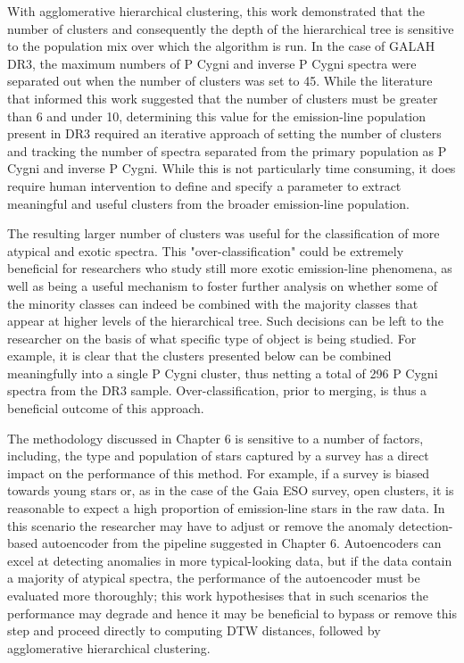 With agglomerative hierarchical clustering, this work demonstrated that the number of clusters and consequently the depth of the hierarchical tree is sensitive to the population mix over which the algorithm is run. In the case of GALAH DR3, the maximum numbers of P Cygni and inverse P Cygni spectra were separated out when the number of clusters was set to 45. While the literature that informed this work suggested that the number of clusters must be greater than 6 and under 10, determining this value for the emission-line population present in DR3 required an iterative approach of setting the number of clusters and tracking the number of spectra separated from the primary population as P Cygni and inverse P Cygni. While this is not particularly time consuming, it does require human intervention to define and specify a parameter to extract meaningful and useful clusters from the broader emission-line population. 

The resulting larger number of clusters was useful for the classification of more atypical and exotic spectra. This "over-classification" could be extremely beneficial for researchers who study still more exotic emission-line phenomena, as well as being a useful mechanism to foster further analysis on whether some of the minority classes can indeed be combined with the majority classes that appear at higher levels of the hierarchical tree. Such decisions can be left to the researcher on the basis of what specific type of object is being studied. For example, it is clear that the clusters presented below can be combined meaningfully into a single P Cygni cluster, thus netting a total of 296 P Cygni spectra from the DR3 sample. Over-classification, prior to merging, is thus a beneficial outcome of this approach. 

The methodology discussed in Chapter 6 is sensitive to a number of factors, including, the type and population of stars captured by a survey has a direct impact on the performance of this method. For example, if a survey is biased towards young stars or, as in the case of the Gaia ESO survey, open clusters, it is reasonable to expect a high proportion of emission-line stars in the raw data. In this scenario the researcher may have to adjust or remove the anomaly detection-based autoencoder from the pipeline suggested in Chapter 6. Autoencoders can excel at detecting anomalies in more typical-looking data, but if the data contain a majority of atypical spectra, the performance of the autoencoder must be evaluated more thoroughly; this work hypothesises that in such scenarios the performance may degrade and hence it may be beneficial to bypass or remove this step and proceed directly to computing DTW distances, followed by agglomerative hierarchical clustering. 

